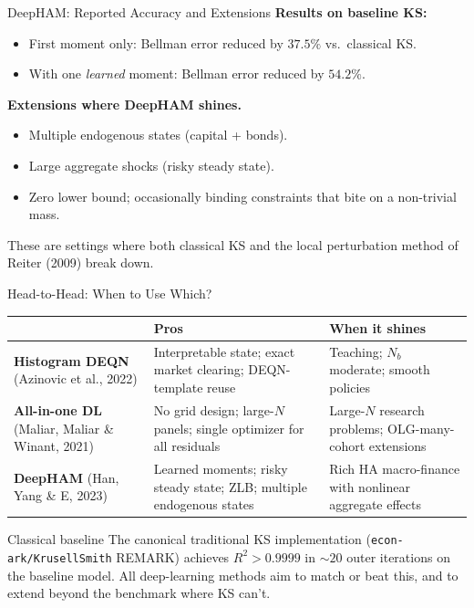 \documentclass[aspectratio=169,11pt]{beamer}
\newcommand{\emphc}[1]{\textcolor{harvardcrimson}{#1}}
\begin{document}
\begin{frame}{DeepHAM: Reported Accuracy and Extensions}
\small
\textbf{Results on baseline KS:}
\begin{itemize}\itemsep2pt
    \item First moment only: Bellman error reduced by $37.5\%$ vs.\ classical KS.
    \item With one \emph{learned} moment: Bellman error reduced by $54.2\%$.
\end{itemize}

\vspace{0.6em}
\textbf{Extensions where DeepHAM shines.}
\begin{itemize}\itemsep2pt
    \item Multiple endogenous states (capital + bonds).
    \item Large aggregate shocks (risky steady state).
    \item Zero lower bound; occasionally binding constraints that bite on a non-trivial mass.
\end{itemize}

\vspace{0.6em}
{\scriptsize These are settings where both classical KS and the local perturbation method of Reiter (2009) break down.}
\end{frame}

\begin{frame}{Head-to-Head: When to Use Which?}
\footnotesize
\begin{center}
\begin{tabular}{p{3.2cm} p{3.6cm} p{3.6cm}}
\toprule
 & \textbf{Pros} & \textbf{When it shines} \\
\midrule
\textbf{Histogram DEQN} (Azinovic et al., 2022) & Interpretable state; exact market clearing; DEQN-template reuse & Teaching; $N_b$ moderate; smooth policies \\
\addlinespace
\textbf{All-in-one DL} (Maliar, Maliar \& Winant, 2021) & No grid design; large-$N$ panels; single optimizer for all residuals & Large-$N$ research problems; OLG-many-cohort extensions \\
\addlinespace
\textbf{DeepHAM} (Han, Yang \& E, 2023) & Learned moments; risky steady state; ZLB; multiple endogenous states & Rich HA macro-finance with nonlinear aggregate effects \\
\bottomrule
\end{tabular}
\end{center}

\vspace{0.3em}
\begin{block}{Classical baseline}
\scriptsize
The canonical \emphc{traditional} KS implementation (\texttt{econ-ark/KrusellSmith} REMARK) achieves $R^2 > 0.9999$ in $\sim 20$ outer iterations on the baseline model.  All deep-learning methods aim to match or beat this, and to extend beyond the benchmark where KS can't.
\end{block}
\end{frame}
\end{document}
